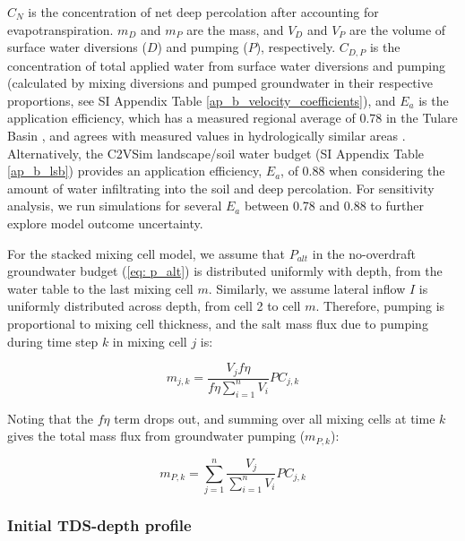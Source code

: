 $C_N$ is the concentration of net deep percolation after accounting for evapotranspiration. $m_D$ and $m_P$ are the mass, and $V_D$ and $V_P$ are the volume of surface water diversions ($D$) and pumping ($P$), respectively. $C_{D,P}$ is the concentration of total applied water from surface water diversions and pumping (calculated by mixing diversions and pumped groundwater in their respective proportions, see SI Appendix Table \ref{ap_b_velocity_coefficients}), and $E_a$ is the application efficiency, which has a measured regional average of 0.78 in the Tulare Basin \citep{sandoval2013spatial}, and agrees with measured values in hydrologically similar areas \citep{hanson1995, howell2003irrigation}. Alternatively, the C2VSim landscape/soil water budget (SI Appendix Table \ref{ap_b_lsb}) provides an application efficiency, $E_a$, of 0.88 when considering the amount of water infiltrating into the soil and deep percolation. For sensitivity analysis, we run simulations for several $E_a$ between 0.78 and 0.88 to further explore model outcome uncertainty.

For the stacked mixing cell model, we assume that $P_{alt}$ in the no-overdraft groundwater budget (\ref{eq: p_alt}) is distributed uniformly with depth, from the water table to the last mixing cell $m$. Similarly, we assume lateral inflow $I$ is uniformly distributed across depth, from cell 2 to cell $m$. Therefore, pumping is proportional to mixing cell thickness, and the salt mass flux due to pumping during time step $k$ in mixing cell $j$ is:

\begin{equation}
m_{j,k} = \frac{V_j f \eta}{f \eta \sum_{i=1}^{n} V_i} P C_{j,k}
\label{eq: pumping_in_cells}
\end{equation}

Noting that the $f \eta$ term drops out, and summing over all mixing cells at time $k$ gives the total mass flux from groundwater pumping ($m_{P, k}$):  

\begin{equation}
m_{P, k} = \sum_{j=1}^{n} \frac{V_j}{\sum_{i=1}^{n} V_i} P C_{j, k}
\end{equation}




%
%
\subsubsection{Initial TDS-depth profile}
\label{ss_2_8}


